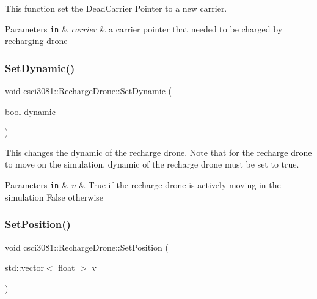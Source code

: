 This function set the Dead\+Carrier Pointer to a new carrier. 


\begin{DoxyParams}[1]{Parameters}
\mbox{\tt in}  & {\em carrier} & a carrier pointer that needed to be charged by recharging drone \\
\hline
\end{DoxyParams}
\mbox{\label{classcsci3081_1_1RechargeDrone_a2c3e7c4f5c4ca78feef664fca810d0ea}} 
\subsubsection{\texorpdfstring{Set\+Dynamic()}{SetDynamic()}}
{\footnotesize\ttfamily void csci3081\+::\+Recharge\+Drone\+::\+Set\+Dynamic (\begin{DoxyParamCaption}\item[{bool}]{dynamic\+\_\+ }\end{DoxyParamCaption})}



This changes the dynamic of the recharge drone. Note that for the recharge drone to move on the simulation, dynamic of the recharge drone must be set to true. 


\begin{DoxyParams}[1]{Parameters}
\mbox{\tt in}  & {\em n} & True if the recharge drone is actively moving in the simulation False otherwise \\
\hline
\end{DoxyParams}
\mbox{\label{classcsci3081_1_1RechargeDrone_a226ad5a957052707e19d986a94a53c2d}} 
\subsubsection{\texorpdfstring{Set\+Position()}{SetPosition()}}
{\footnotesize\ttfamily void csci3081\+::\+Recharge\+Drone\+::\+Set\+Position (\begin{DoxyParamCaption}\item[{std\+::vector$<$ float $>$}]{v }\end{DoxyParamCaption})}



